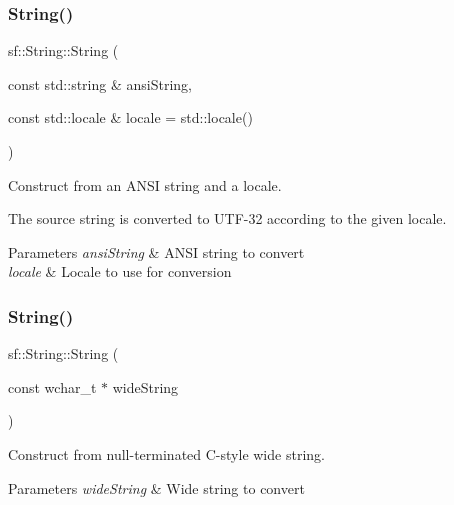 \subsubsection{\texorpdfstring{String()}{String()}\hspace{0.1cm}{\footnotesize\ttfamily [6/11]}}
{\footnotesize\ttfamily sf\+::\+String\+::\+String (\begin{DoxyParamCaption}\item[{const std\+::string \&}]{ansi\+String,  }\item[{const std\+::locale \&}]{locale = {\ttfamily std\+:\+:locale()} }\end{DoxyParamCaption})}



Construct from an A\+N\+SI string and a locale. 

The source string is converted to U\+T\+F-\/32 according to the given locale.


\begin{DoxyParams}{Parameters}
{\em ansi\+String} & A\+N\+SI string to convert \\
\hline
{\em locale} & Locale to use for conversion \\
\hline
\end{DoxyParams}
\mbox{\label{classsf_1_1_string_a5742d0a9b0c754f711820c2b5c40fa55}} 
\subsubsection{\texorpdfstring{String()}{String()}\hspace{0.1cm}{\footnotesize\ttfamily [7/11]}}
{\footnotesize\ttfamily sf\+::\+String\+::\+String (\begin{DoxyParamCaption}\item[{const wchar\+\_\+t $\ast$}]{wide\+String }\end{DoxyParamCaption})}



Construct from null-\/terminated C-\/style wide string. 


\begin{DoxyParams}{Parameters}
{\em wide\+String} & Wide string to convert \\
\hline
\end{DoxyParams}
\mbox{\label{classsf_1_1_string_a5e38151340af4f9a5f74ad24c0664074}} 
